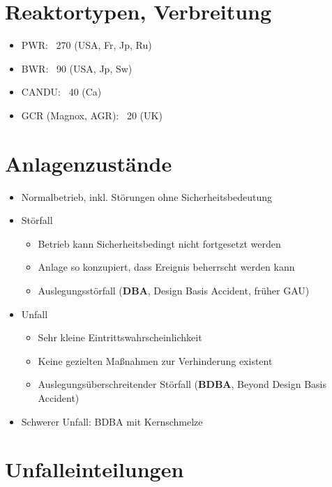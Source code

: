 \documentclass[12pt]{article}
\begin{document}
\section{Reaktortypen, Verbreitung}
\begin{itemize}
  \item PWR: ~270 (USA, Fr, Jp, Ru)
  \item BWR: ~90 (USA, Jp, Sw)
  \item CANDU: ~40 (Ca)
  \item GCR (Magnox, AGR): ~20 (UK)
\end{itemize}

\section{Anlagenzustände}
\begin{itemize}
  \item Normalbetrieb, inkl. Störungen ohne Sicherheitsbedeutung
  \item Störfall
  \begin{itemize}
    \item Betrieb kann Sicherheitsbedingt nicht fortgesetzt werden
    \item Anlage so konzupiert, dass Ereignis beherrscht werden kann
    \item Auslegungsstörfall (\textbf{DBA}, Design Basis Accident, früher GAU)
  \end{itemize}
  \item Unfall
  \begin{itemize}
    \item Sehr kleine Eintrittswahrscheinlichkeit
    \item Keine gezielten Maßnahmen zur Verhinderung existent
    \item Auslegungsüberschreitender Störfall (\textbf{BDBA}, Beyond Design Basis Accident)
  \end{itemize}
  \item Schwerer Unfall: BDBA mit Kernschmelze
\end{itemize}

\section{Unfalleinteilungen}
\end{document}
